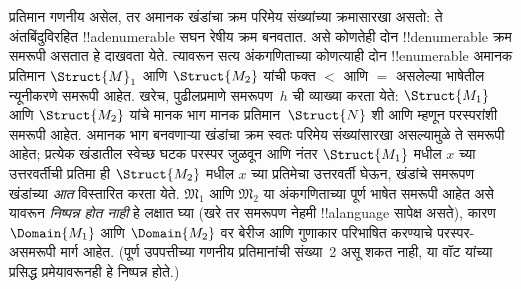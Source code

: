 \documentclass[../../../include/open-logic-section]{subfiles}
\begin{document}
\begin{explain}
प्रतिमान गणनीय असेल, तर अमानक खंडांचा क्रम परिमेय संख्यांच्या क्रमासारखा
असतो: ते अंतबिंदुविरहित !!a{denumerable} सघन रेषीय क्रम बनवतात. असे
कोणतेही दोन !!{denumerable} क्रम समरूपी असतात हे दाखवता येते. त्यावरून
सत्य अंकगणिताच्या कोणत्याही दोन !!{enumerable} अमानक प्रतिमान
$\Struct{M}_1$ आणि $\Struct{M_2}$ यांची फक्त $<$ आणि $=$ असलेल्या भाषेतील
न्यूनीकरणे समरूपी आहेत. खरेच, पुढीलप्रमाणे समरूपण~$h$ ची व्याख्या करता
येते: $\Struct{M_1}$ आणि $\Struct{M_2}$ यांचे मानक भाग मानक
प्रतिमान~$\Struct{N}$ शी आणि म्हणून परस्परांशी समरूपी आहेत. अमानक भाग
बनवणाऱ्या खंडांचा क्रम स्वतः परिमेय संख्यांसारखा असल्यामुळे ते समरूपी आहेत;
प्रत्येक खंडातील स्वेच्छ घटक परस्पर जुळवून आणि नंतर $\Struct{M_1}$ मधील
$x$ च्या उत्तरवर्तीची प्रतिमा ही $\Struct{M_2}$ मधील $x$ च्या प्रतिमेचा
उत्तरवर्ती घेऊन, खंडांचे समरूपण खंडांच्या \emph{आत} विस्तारित करता येते.
$\mathfrak{M}_1$ आणि $\mathfrak{M}_2$ या अंकगणिताच्या पूर्ण भाषेत समरूपी
आहेत असे यावरून \emph{निष्पन्न होत नाही} हे लक्षात घ्या (खरे तर समरूपण
नेहमी !!a{language} सापेक्ष असते), कारण $\Domain{M_1}$ आणि
$\Domain{M_2}$ वर बेरीज आणि गुणाकार परिभाषित करण्याचे परस्पर-असमरूपी मार्ग
आहेत. (पूर्ण उपपत्तीच्या गणनीय प्रतिमानांची संख्या~2 असू शकत नाही, या
वॉट यांच्या प्रसिद्ध प्रमेयावरूनही हे निष्पन्न होते.)
\end{explain}
\end{document}
